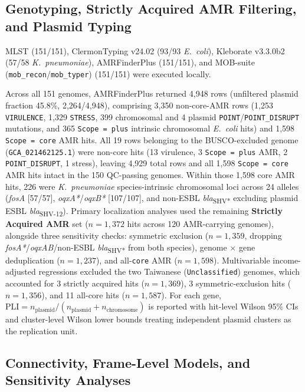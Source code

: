 \documentclass[11pt,a4paper]{article}
\begin{document}
\subsection{Genotyping, Strictly Acquired AMR Filtering, and Plasmid Typing}

MLST (151/151), ClermonTyping v24.02 \cite{beghain2018} (93/93 \textit{E.~coli}), Kleborate v3.3.0b2 \cite{lam2021} (57/58 \textit{K.~pneumoniae}), AMRFinderPlus \cite{feldgarden2021} (151/151), and MOB-suite (\texttt{mob\_recon}/\texttt{mob\_typer}) \cite{robertson2018,robertson2020} (151/151) were executed locally.

Across all 151 genomes, AMRFinderPlus returned 4,948 rows (unfiltered plasmid fraction 45.8\%, 2,264/4,948), comprising 3,350 non-core-AMR rows (1,253 \texttt{VIRULENCE}, 1,329 \texttt{STRESS}, 399 chromosomal and 4 plasmid \texttt{POINT}/\texttt{POINT\_DISRUPT} mutations, and 365 \texttt{Scope = plus} intrinsic chromosomal \textit{E.~coli} hits) and 1,598 \texttt{Scope = core} AMR hits. All 19 rows belonging to the BUSCO-excluded genome (\texttt{GCA\_021462125.1}) were non-core hits (13 virulence, 3 \texttt{Scope = plus} AMR, 2 \texttt{POINT\_DISRUPT}, 1 stress), leaving 4,929 total rows and all 1,598 \texttt{Scope = core} AMR hits intact in the 150 QC-passing genomes. Within those 1,598 core AMR hits, 226 were \textit{K.~pneumoniae} species-intrinsic chromosomal loci across 24 alleles (\textit{fosA} [57/57], \textit{oqxA*}/\textit{oqxB*} [107/107], and non-ESBL \textit{bla}\textsubscript{SHV*} excluding plasmid ESBL \textit{bla}\textsubscript{SHV-12}). Primary localization analyses used the remaining \textbf{Strictly Acquired AMR} set ($n = 1{,}372$ hits across 120 AMR-carrying genomes), alongside three sensitivity checks: symmetric exclusion ($n = 1{,}359$, dropping \textit{fosA*}/\textit{oqxAB}/non-ESBL \textit{bla}\textsubscript{SHV*} from both species), genome $\times$ gene deduplication ($n = 1{,}237$), and all-\texttt{core} AMR ($n = 1{,}598$). Multivariable income-adjusted regressions excluded the two Taiwanese (\texttt{Unclassified}) genomes, which accounted for 3 strictly acquired hits ($n = 1{,}369$), 3 symmetric-exclusion hits ($n = 1{,}356$), and 11 all-core hits ($n = 1{,}587$). For each gene, $\mathrm{PLI} = n_{\text{plasmid}} / (n_{\text{plasmid}} + n_{\text{chromosome}})$ is reported with hit-level Wilson 95\% CIs and cluster-level Wilson lower bounds treating independent plasmid clusters as the replication unit.

\subsection{Connectivity, Frame-Level Models, and Sensitivity Analyses}
\end{document}
